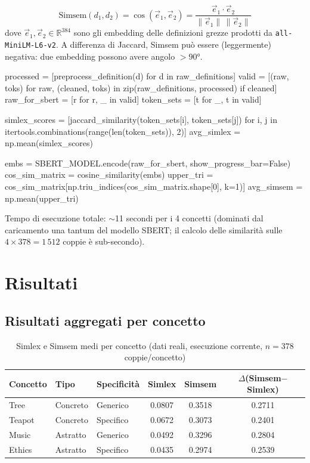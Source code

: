 \documentclass[12pt,a4paper]{article}
\begin{document}
\[
  \text{Simsem}(d_1, d_2) = \cos(\vec{e}_1, \vec{e}_2) = \frac{\vec{e}_1 \cdot \vec{e}_2}{\lVert \vec{e}_1 \rVert \, \lVert \vec{e}_2 \rVert}
\]
dove $\vec{e}_1, \vec{e}_2 \in \mathbb{R}^{384}$ sono gli embedding delle definizioni grezze prodotti da \texttt{all-MiniLM-L6-v2}. A differenza di Jaccard, Simsem pu\`o essere (leggermente) negativa: due embedding possono avere angolo $>90°$.

\begin{pylisting}[title={Calcolo di Simlex e Simsem per un concetto}]
processed = [preprocess_definition(d) for d in raw_definitions]
valid = [(raw, toks) for raw, (cleaned, toks)
         in zip(raw_definitions, processed) if cleaned]
raw_for_sbert = [r for r, _ in valid]
token_sets    = [t for _, t in valid]

simlex_scores = [jaccard_similarity(token_sets[i], token_sets[j])
                  for i, j in itertools.combinations(range(len(token_sets)), 2)]
avg_simlex = np.mean(simlex_scores)

embs = SBERT_MODEL.encode(raw_for_sbert, show_progress_bar=False)
cos_sim_matrix = cosine_similarity(embs)
upper_tri = cos_sim_matrix[np.triu_indices(cos_sim_matrix.shape[0], k=1)]
avg_simsem = np.mean(upper_tri)
\end{pylisting}

Tempo di esecuzione totale: $\sim$11 secondi per i 4 concetti (dominati dal caricamento una tantum del modello SBERT; il calcolo delle similarit\`a sulle $4\times378=1\,512$ coppie \`e sub-secondo).

\section{Risultati}

\subsection{Risultati aggregati per concetto}

\begin{table}[H]
  \centering
  \caption{Simlex e Simsem medi per concetto (dati reali, esecuzione corrente, $n=378$ coppie/concetto)}
  \begin{tabular}{lllccc}
    \toprule
    \textbf{Concetto} & \textbf{Tipo} & \textbf{Specificit\`a} & \textbf{Simlex} & \textbf{Simsem} & \textbf{$\Delta$(Simsem$-$Simlex)} \\
    \midrule
    Tree   & Concreto & Generico  & 0.0807 & 0.3518 & 0.2711 \\
    Teapot & Concreto & Specifico & 0.0672 & 0.3073 & 0.2401 \\
    Music  & Astratto & Generico  & 0.0492 & 0.3296 & 0.2804 \\
    Ethics & Astratto & Specifico & 0.0435 & 0.2974 & 0.2539 \\
    \bottomrule
  \end{tabular}
\end{table}
\end{document}
